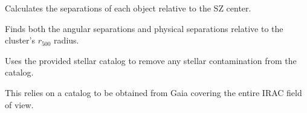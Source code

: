 \documentclass[letterpaper,12pt,english]{sphinxmanual}
\begin{document}
\begin{fulllineitems}
\begin{fulllineitems}
\label{\detokenize{api/selector:SPTclIRAGN.Pipeline_functions.SelectIRAGN.object_separations}}
\pysigstartsignatures
{}
\pysigstopsignatures
\sphinxAtStartPar
Calculates the separations of each object relative to the SZ center.

\sphinxAtStartPar
Finds both the angular separations and physical separations relative to the cluster’s \(r_{500}\) radius.

\end{fulllineitems}


\begin{fulllineitems}
\label{\detokenize{api/selector:SPTclIRAGN.Pipeline_functions.SelectIRAGN.remove_stars}}
\pysigstartsignatures
{}
\pysigstopsignatures
\sphinxAtStartPar
Uses the provided stellar catalog to remove any stellar contamination from the catalog.

\sphinxAtStartPar
This relies on a catalog to be obtained from Gaia covering the entire IRAC field of view.

\end{fulllineitems}



\end{fulllineitems}
\end{document}
